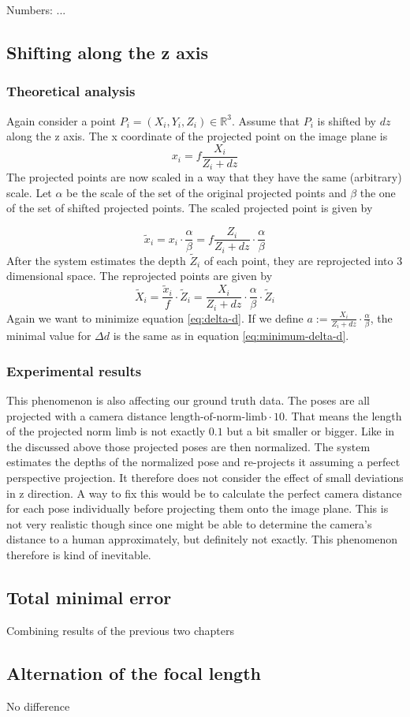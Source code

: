 	Numbers: ...
	
\subsection{Shifting along the z axis}
\label{sec:z-shift-error}
\subsubsection{Theoretical analysis}
Again consider a point $P_i=(X_i, Y_i, Z_i) \in \mathbb{R}^3$. Assume that $P_i$ is shifted by $dz$ along the z axis.
The x coordinate of the projected point on the image plane is
\begin{equation}
	x_i = f \frac{X_i}{Z_i + dz}
\end{equation}
The projected points are now scaled in a way that they have the same (arbitrary) scale.  Let $\alpha$ be the scale of the set of the original projected points and $\beta$ the one of the set of shifted projected points. The scaled projected point is given by

\begin{equation}
		\widetilde{x}_i = x_i \cdot \frac{\alpha}{\beta} 
		= f \frac{Z_i}{Z_i + dz}\cdot \frac{\alpha}{\beta} 
\end{equation}
After the system estimates the depth $\widetilde{Z}_i$ of each point, they are reprojected into 3 dimensional space.
The reprojected points are given by
\begin{equation}
	\widetilde{X}_i = \frac{\widetilde{x}_i}{f} \cdot \widetilde{Z}_i
	= \frac{X_i}{Z_i + dz}\cdot \frac{\alpha}{\beta}  \cdot \widetilde{Z}_i
\end{equation}
Again we want to minimize equation \eqref{eq:delta-d}.
If we define $a := \frac{X_i}{Z_i + dz}\cdot \frac{\alpha}{\beta}$, the minimal value for $\Delta d$ is the same as in equation \eqref{eq:minimum-delta-d}.


\subsubsection{Experimental results}
	This phenomenon is also affecting our ground truth data. The poses are all projected with a camera distance $ \text{length-of-norm-limb} \cdot 10$. 
	That means the length of the projected norm limb is not exactly $0.1$ but a bit smaller or bigger. 
	Like in the discussed above those projected poses are then normalized. 
	The system estimates the depths of the normalized pose and re-projects it assuming a perfect perspective projection. 
	It therefore does not consider the effect of small deviations in z direction.
	A way to fix this would be to calculate the perfect camera distance for each pose individually before projecting them onto the image plane.
	This is not very realistic though since one might be able to determine the camera's distance to a human approximately, but definitely not exactly. This phenomenon therefore is kind of inevitable.
 
	
\subsection{Total minimal error}

Combining results of the previous two chapters

\subsection{Alternation of the focal length}
No difference

